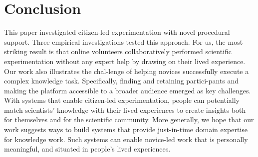 \section{Conclusion}
This paper investigated citizen-led experimentation with novel procedural support. Three empirical investigations tested this approach. For us, the most striking result is that online volunteers collaboratively performed scientific experimentation without any expert help by drawing on their lived experience. Our work also illustrates the chal-lenge of helping novices successfully execute a complex knowledge task. Specifically, finding and retaining partici-pants and making the platform accessible to a broader audience emerged as key challenges. With systems that enable citizen-led experimentation, people can potentially match scientists’ knowledge with their lived experiences to create insights both for themselves and for the scientific community. More generally, we hope that our work suggests ways to build systems that provide just-in-time domain expertise for knowledge work. Such systems can enable novice-led work that is personally meaningful, and situated in people’s lived experiences.

